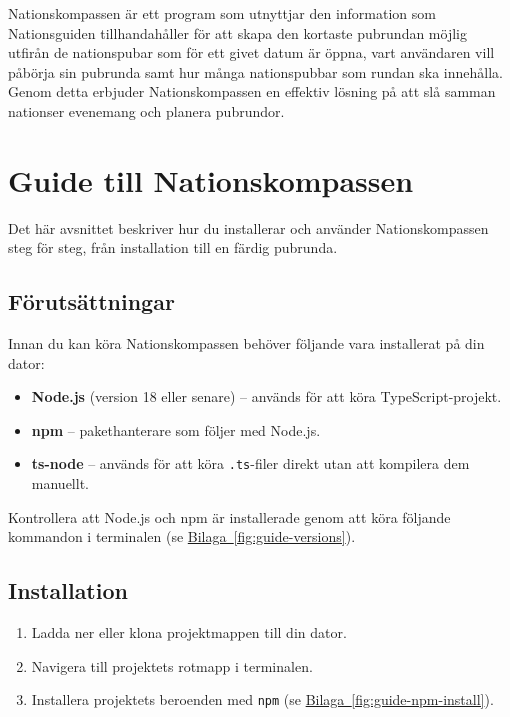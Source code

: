 \documentclass[a4paper, 12pt]{article}
\begin{document}
    Nationskompassen är ett program som utnyttjar den information som Nationsguiden tillhandahåller för att skapa den kortaste pubrundan möjlig utfirån de nationspubar som för ett givet datum är öppna, vart användaren vill påbörja sin pubrunda samt hur många nationspubbar som rundan ska innehålla. Genom detta erbjuder Nationskompassen en effektiv lösning på att slå samman nationser evenemang och planera pubrundor.

\section{Guide till Nationskompassen}
\label{sec: guide}

    Det här avsnittet beskriver hur du installerar och använder Nationskompassen steg för steg, från installation till en färdig pubrunda.

    \subsection{Förutsättningar}

        Innan du kan köra Nationskompassen behöver följande vara installerat på din dator:

        \begin{itemize}
            \item \textbf{Node.js} (version 18 eller senare) -- används för att köra TypeScript-projekt.
            \item \textbf{npm} -- pakethanterare som följer med Node.js.
            \item \textbf{ts-node} -- används för att köra \texttt{.ts}-filer direkt utan att kompilera dem manuellt.
        \end{itemize}

        Kontrollera att Node.js och npm är installerade genom att köra följande kommandon i terminalen (se \hyperref[fig:guide-versions]{Bilaga~\ref*{fig:guide-versions}}).

    \subsection{Installation}

        \begin{enumerate}
            \item Ladda ner eller klona projektmappen till din dator.
            \item Navigera till projektets rotmapp i terminalen.
            \item Installera projektets beroenden med \texttt{npm} (se \hyperref[fig:guide-npm-install]{Bilaga~\ref*{fig:guide-npm-install}}).
        \end{enumerate}
\end{document}

